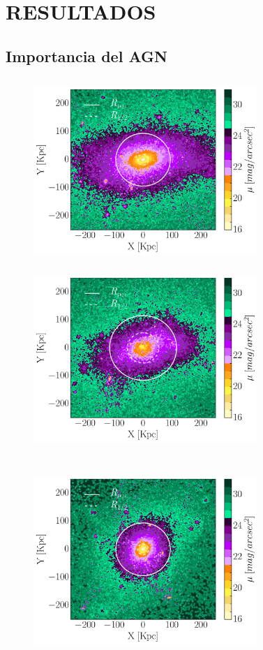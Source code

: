 
\chapter{RESULTADOS} %

\label{Chapter4} %

\section{Importancia del AGN}

\begin{figure}[H]
\centering
\includegraphics[height=7cm,width=8.5cm,trim={0cm 2cm 3.3cm 0cm},clip]{Figures/d1csf.pdf}
\includegraphics[height=7cm,width=8.5cm,trim={3.1cm 2cm 0cm 0cm},clip]{Figures/d1agn.pdf}
\includegraphics[height=8cm,width=8.5cm,trim={0cm 0cm 3.3cm 0cm},clip]{Figures/d2csf.pdf}

\end{figure}
